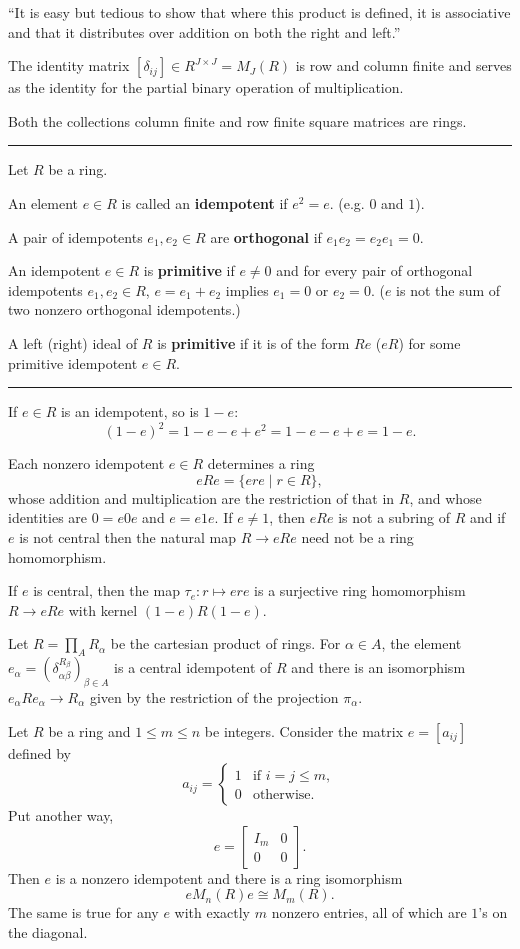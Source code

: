 \documentclass[12pt]{article}
\newcommand{\keyword}[1]{\textbf{#1}}
\newcommand{\sepline}{\rule{\textwidth}{0.4pt}}
\theoremstyle{definition}
\newcommand{\<}{\left\langle}
\renewcommand{\>}{\right\rangle}
\newcommand{\iso}{\cong}
\newcommand{\mat}[1]{\begin{bmatrix}#1\end{bmatrix}}
\renewcommand{\_}[1]{{_{#1}}}
\begin{document}
``It is easy but tedious to show that where this product is defined, it is associative and that it distributes over addition on both the right and left.''

The identity matrix $[\delta_{ij}] \in R^{J \times J} = M_J(R)$ is row and column finite and serves as the identity for the partial binary operation of multiplication.

Both the collections column finite and row finite square matrices are rings.

\sepline

Let $R$ be a ring.

An element $e \in R$ is called an \keyword{idempotent} if $e^2 = e$.
(e.g. $0$ and $1$).

A pair of idempotents $e_1, e_2 \in R$ are \keyword{orthogonal} if $e_1e_2 = e_2e_1 = 0$.

An idempotent $e \in R$ is \keyword{primitive} if $e \ne 0$ and for every pair of orthogonal idempotents $e_1, e_2 \in R$, $e = e_1 + e_2$ implies $e_1 = 0$ or $e_2 = 0$.
($e$ is not the sum of two nonzero orthogonal idempotents.)

A left (right) ideal of $R$ is \keyword{primitive} if it is of the form $Re$ ($eR$) for some primitive idempotent $e \in R$.

\sepline

If $e \in R$ is an idempotent, so is $1 - e$:
\[
    (1 - e)^2
        = 1 - e - e + e^2
        = 1 - e - e + e
        = 1 - e.
\]

Each nonzero idempotent $e \in R$ determines a ring
\[
    eRe = \{ere \mid r \in R\},
\]
whose addition and multiplication are the restriction of that in $R$, and whose identities are $0 = e0e$ and $e = e1e$.
If $e \ne 1$, then $eRe$ is not a subring of $R$ and if $e$ is not central then the natural map $R \to eRe$ need not be a ring homomorphism.

If $e$ is central, then the map $\tau_e : r \mapsto ere$ is a surjective ring homomorphism $R \to eRe$ with kernel $(1 - e)R(1 - e)$.

Let $R = \prod_{A} R_\alpha$ be the cartesian product of rings.
For $\alpha \in A$, the element $e_\alpha = (\delta_{\alpha\beta}^{R_\beta})_{\beta \in A}$ is a central idempotent of $R$ and there is an isomorphism $e_\alpha R e_\alpha \to R_\alpha$ given by the restriction of the projection $\pi_\alpha$.

Let $R$ be a ring and $1 \leq m \leq n$ be integers.
Consider the matrix $e = [a_{ij}]$ defined by
\[
    a_{ij} = \begin{cases}
        1 & \text{if } i = j \leq m, \\
        0 & \text{otherwise}.
    \end{cases}
\]
Put another way,
\[
    e = \mat{I_m & 0 \\ 0 & 0}.
\]
Then $e$ is a nonzero idempotent and there is a ring isomorphism
\[
    eM_n(R)e \iso M_m(R).
\]
The same is true for any $e$ with exactly $m$ nonzero entries, all of which are $1$'s on the diagonal.
\end{document}
